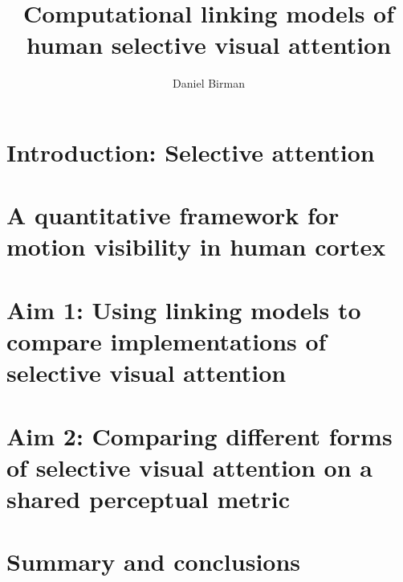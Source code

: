 \documentclass{report}
\begin{document}
\title{Computational linking models of\\human selective visual attention}
\author{Daniel Birman}

\beforepreface
{}

 


% 




\afterpreface

\chapter[Introduction]{Introduction: Selective attention}



\chapter[A framework for motion visibility]{A quantitative framework for motion visibility in human cortex}



\chapter[Fixed vs. flexible readout]{Aim 1: Using linking models to compare implementations of selective visual attention}



\chapter[Comparing spatial and feature-based attention]{Aim 2: Comparing different forms of selective visual attention on a shared perceptual metric}



\chapter[Conclusions]{Summary and conclusions}




\newpage
{}
\printbibliography
\end{document}

